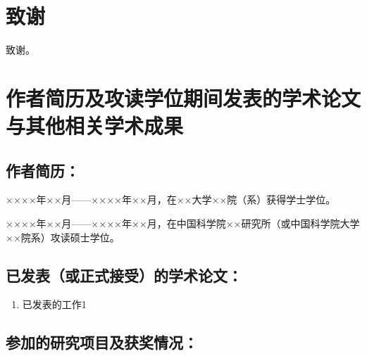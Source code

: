 \chapter[致谢]{致\quad 谢}%

致谢。


\chapter{作者简历及攻读学位期间发表的学术论文与其他相关学术成果}

\section*{作者简历：}
××××年××月——××××年××月，在××大学××院（系）获得学士学位。


××××年××月——××××年××月，在中国科学院××研究所（或中国科学院大学××院系）攻读硕士学位。


\section*{已发表（或正式接受）的学术论文：}

{
\setlist[enumerate]{}%
\begin{enumerate}[nosep]
    \item 已发表的工作1
\end{enumerate}
}


\section*{参加的研究项目及获奖情况：}


\cleardoublepage[plain]%
